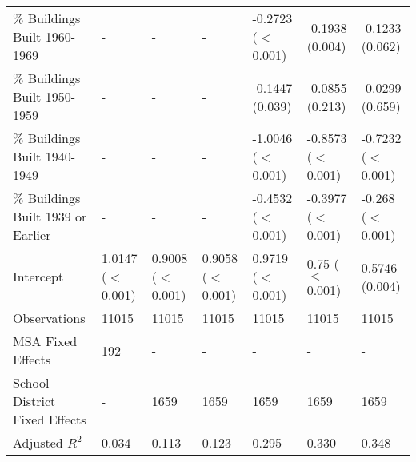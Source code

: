 \begin{table}[h]
\begin{tabular}{l|llllll}
\% Buildings Built 1960-1969 &- & - & - & -0.2723 ($<$0.001) & -0.1938 (0.004) & -0.1233 (0.062) \\
\% Buildings Built 1950-1959 &- & - & - & -0.1447 (0.039) & -0.0855 (0.213) & -0.0299 (0.659) \\
\% Buildings Built 1940-1949 &- & - & - & -1.0046 ($<$0.001) & -0.8573 ($<$0.001) & -0.7232 ($<$0.001) \\
\% Buildings Built 1939 or Earlier &- & - & - & -0.4532 ($<$0.001) & -0.3977 ($<$0.001) & -0.268 ($<$0.001) \\
Intercept &1.0147 ($<$0.001) & 0.9008 ($<$0.001) & 0.9058 ($<$0.001) & 0.9719 ($<$0.001) & 0.75 ($<$0.001) & 0.5746 (0.004) \\
Observations &11015 & 11015 & 11015 & 11015 & 11015 & 11015 \\
MSA Fixed Effects &192 & - & - & - & - & - \\
School District Fixed Effects &- & 1659 & 1659 & 1659 & 1659 & 1659 \\
Adjusted $R^2$ &0.034 & 0.113 & 0.123 & 0.295 & 0.330 & 0.348 \\\hline
\end{tabular}
\end{table}
